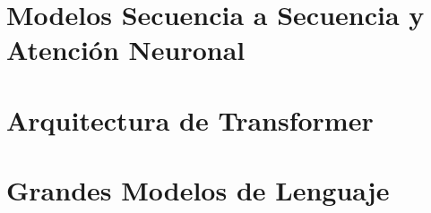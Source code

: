 \documentclass[11pt,fleqn]{book} %
\begin{document}
\chapter{Modelos Secuencia a Secuencia y Atención Neuronal}
\label{cap_sec}



\chapter{Arquitectura de Transformer}
\label{cap_trans}






\chapter{Grandes Modelos de Lenguaje}
\label{cap_llm}




\end{document}

